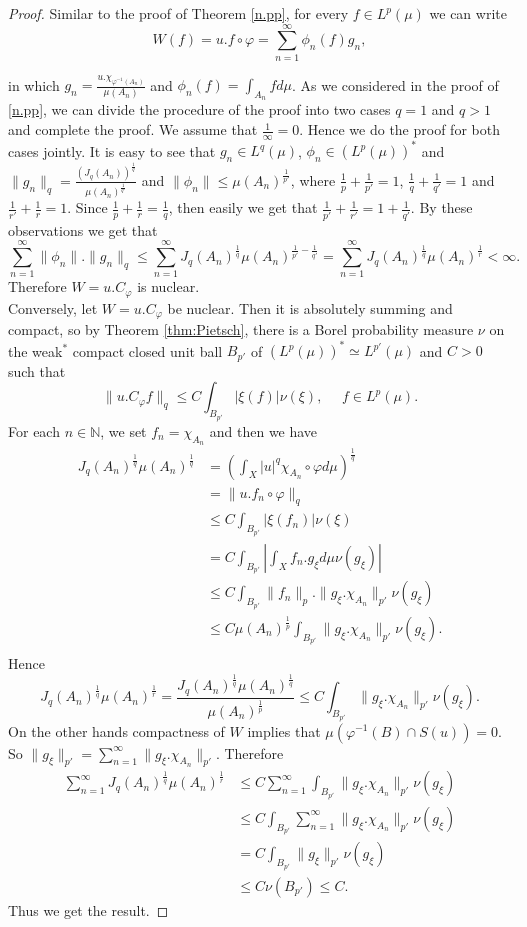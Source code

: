 \documentclass{amsart}
\theoremstyle{definition}\newtheorem{defn}[thm]{Definition}
\theoremstyle{remark}
\numberwithin{equation}{section}
\begin{document}
\begin{proof}
Similar to the proof of Theorem \ref{n.pp}, for every $f\in L^p(\mu)$ we can write
$$W(f)=u.f\circ \varphi=\sum^{\infty}_{n=1}\phi_n(f)g_n,$$

in which $g_n=\frac{u.\chi_{\varphi^{-1}(A_n)}}{\mu(A_n)}$ and $\phi_n(f)=\int_{A_n}fd\mu$. As we considered in the proof of \ref{n.pp}, we can divide the procedure of the proof into two cases $q=1$ and $q>1$ and complete the proof. We assume that $\frac{1}{\infty}=0$. Hence we do the proof for both cases jointly. It is easy to see that $g_n\in L^q(\mu)$, $\phi_n\in (L^p(\mu))^*$ and $\|g_n\|_q=\frac{(J_q(A_n))^{\frac{1}{q}}}{\mu(A_n)^{\frac{1}{q'}}}$ and $\|\phi_n\|\leq\mu(A_n)^{\frac{1}{p'}}$, where $\frac{1}{p}+\frac{1}{p'}=1$, $\frac{1}{q}+\frac{1}{q'}=1$ and $\frac{1}{r'}+\frac{1}{r}=1$. Since $\frac{1}{p}+\frac{1}{r}=\frac{1}{q}$, then easily we get that $\frac{1}{p'}+\frac{1}{r'}=1+\frac{1}{q'}$. By these observations we get that 
$$\sum^{\infty}_{n=1}\|\phi_n\|.\|g_n\|_q\leq \sum^{\infty}_{n=1}J_q(A_n)^{\frac{1}{q}}\mu(A_n)^{\frac{1}{p'}-\frac{1}{q'}}=\sum^{\infty}_{n=1}J_q(A_n)^{\frac{1}{q}}\mu(A_n)^{\frac{1}{r}}<\infty.$$
Therefore $W=u.C_{\varphi}$ is nuclear.\\
Conversely, let $W=u.C_{\varphi}$ be nuclear. Then it is absolutely summing and compact, so by Theorem \ref{thm:Pietsch}, there is a Borel probability measure $\nu$ on the weak$^*$ compact closed unit ball $B_{p'}$ of $(L^p(\mu))^*\simeq L^{p'}(\mu)$ and $C>0$ such that
$$\|u.C_{\varphi}f\|_q\leq C \int_{B_{p'}}|\xi(f)|\nu(\xi), \ \ \ \ \ \ f\in L^p(\mu).$$
For each $n\in \mathbb{N}$, we set $f_n=\chi_{A_n}$ and then we have
\begin{align*}
J_q(A_n)^{\frac{1}{q}}\mu(A_n)^{\frac{1}{q}}&=\left(\int_X|u|^q\chi_{A_n}\circ\varphi d\mu\right)^{\frac{1}{q}}\\
&=\|u.f_n\circ\varphi\|_q\\
&\leq C\int_{B_{p'}}|\xi(f_n)|\nu(\xi)\\
&=C\int_{B_{p'}}|\int_X f_n.g_{\xi}d\mu\nu(g_{\xi})|\\
&\leq C \int_{B_{p'}}\|f_n\|_p.\|g_{\xi}.\chi_{A_n}\|_{p'}\nu(g_{\xi})\\
&\leq C\mu(A_n)^{\frac{1}{p}}\int_{B_{p'}}\|g_{\xi}.\chi_{A_n}\|_{p'}\nu(g_{\xi}).\\
\end{align*}
Hence 
$$J_q(A_n)^{\frac{1}{q}}\mu(A_n)^{\frac{1}{r}}=\frac{J_q(A_n)^{\frac{1}{q}}\mu(A_n)^{\frac{1}{q}}}{\mu(A_n)^{\frac{1}{p}}}\leq C\int_{B_{p'}}\|g_{\xi}.\chi_{A_n}\|_{p'}\nu(g_{\xi}).$$
 On the other hands compactness of $W$ implies that $\mu(\varphi^{-1}(B)\cap S(u))=0$. So $\|g_{\xi}\|_{p'}=\sum^{\infty}_{n=1}\|g_{\xi}.\chi_{A_n}\|_{p'}$. Therefore
\begin{align*}
\sum^{\infty}_{n=1}J_q(A_n)^{\frac{1}{q}}\mu(A_n)^{\frac{1}{r}}&\leq C\sum^{\infty}_{n=1}\int_{B_{p'}}\|g_{\xi}.\chi_{A_n}\|_{p'}\nu(g_{\xi})\\
&\leq C\int_{B_{p'}}\sum^{\infty}_{n=1}\|g_{\xi}.\chi_{A_n}\|_{p'}\nu(g_{\xi})\\
&=C\int_{B_{p'}}\|g_{\xi}\|_{p'}\nu(g_{\xi})\\
&\leq C\nu(B_{p'})\leq C.
\end{align*}
Thus we get the result.
\end{proof}
\end{document}
